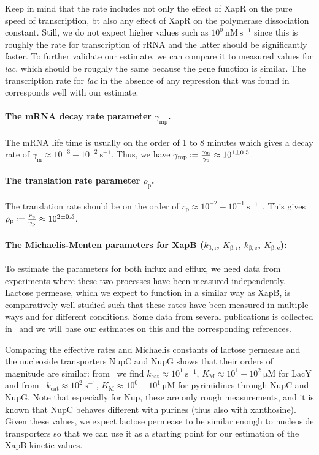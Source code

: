\documentclass[10pt,letterpaper]{article}
\newcommand{\n}[1]{\mathrm{#1}}
\newcommand*{\defeq}{\mathrel{\vcenter{\baselineskip0.5ex \lineskiplimit0pt
			\hbox{\scriptsize.}\hbox{\scriptsize.}}}%
	=}
\begin{document}
Keep in mind that the rate includes not only the effect of XapR on the pure
speed of transcription, bt also any effect of XapR on the polymerase
dissociation constant. Still, we do not expect higher values such as
$10^{0}~\n{nM\ s^{-1}}$ since this is roughly the rate for transcription of
rRNA and the latter should be significantly faster. To further validate our
estimate, we can compare it to measured values for \emph{lac}, which should
be roughly the same because the gene function is similar. The transcription
rate for \emph{lac} in the absence of any repression that was found
in~\cite{RazoMejia2019} corresponds well with our estimate.

\paragraph*{The mRNA decay rate parameter $\gamma_{\n{mp}}$.}
The mRNA life time is usually on the order of 1 to 8 minutes which gives a
decay rate of $\gamma_{\n{m}} \approx 10^{-3} - 10^{-2}~\n{s^{-1}}$. Thus,
we have $\gamma_{\n{mp}} \defeq \frac{\gamma_{\n{m}}}{\gamma_{\n{p}}}
\approx 10^{1 \pm 0.5}$. 

\paragraph*{The translation rate parameter $\rho_{\n{p}}$.}
The translation rate should be on the order of $r_{\n{p}} \approx 10^{-2} -
10^{-1}~\n{s^{-1}}$~\cite{Milo2016}. This gives $\rho_{\n{p}} \defeq
\frac{r_{\n{p}}}{\gamma_{\n{p}}} \approx 10^{2 \pm 0.5}$.


\paragraph*{The Michaelis-Menten parameters for XapB ($k_{\n{\beta,i}}$, $K_{\n{\beta,i}}$, $k_{\n{\beta,e}}$, $K_{\n{\beta,e}}$):}
To estimate the parameters for both influx and efflux, we need data from
experiments where these two processes have been measured independently.
Lactose permease, which we expect to function in a similar way as XapB, is
comparatively well studied such that these rates have been measured in
multiple ways and for different conditions. Some data from several
publications is collected in~\cite{Viitanen1984} and we will base our
estimates on this and the corresponding references.

Comparing the effective rates and Michaelis constants of lactose permease
and the nucleoside transporters NupC and NupG shows that their orders of
magnitude are similar: from~\cite{Dornmair1989,Wright1985} we find
$k_{\n{cat}} \approx 10^1~\n{s^{-1}}$, $K_{\n{M}} \approx 10^1-10^2~\n{\mu
M}$ for LacY and from~\cite{Norholm2001,Komatsu1973,MunchPetersen1979}
$k_{\n{cat}} \approx 10^2~\n{s^{-1}}$, $K_{\n{M}} \approx 10^0-10^1~\n{\mu
M}$ for pyrimidines through NupC and NupG. Note that especially for Nup,
these are only rough measurements, and it is known that NupC behaves
different with purines (thus also with xanthosine). Given these values, we
expect lactose permease to be similar enough to nucleoside transporters so
that we can use it as a starting point for our estimation of the XapB
kinetic values.
\end{document}
